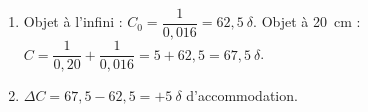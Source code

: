 \documentclass[11pt,a4paper]{article}
\begin{document}
\begin{corrige}
\begin{enumerate}[label=\alph*)]
  \item Objet à l'infini : $C_0=\dfrac{1}{0,016}=62{,}5~\delta$. Objet à \qty{20}{\cm} :
        $C=\dfrac{1}{0,20}+\dfrac{1}{0,016}=5+62{,}5=67{,}5~\delta$.
  \item $\Delta C=67{,}5-62{,}5=+5~\delta$ d'accommodation.
\end{enumerate}
\end{corrige}
\end{document}
